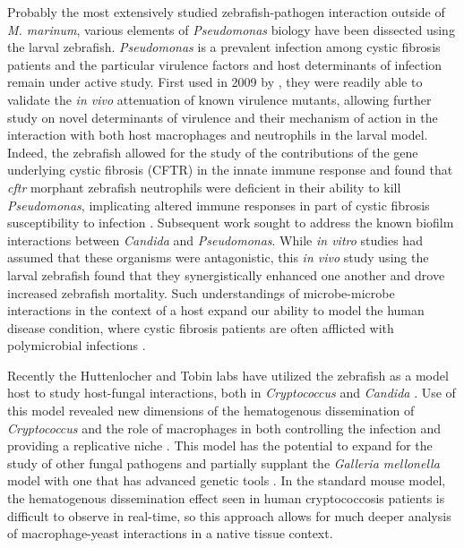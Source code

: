 Probably the most extensively studied zebrafish-pathogen interaction outside of \textit{M. marinum}, various elements of \textit{Pseudomonas} biology have been dissected using the larval zebrafish. \textit{Pseudomonas} is a prevalent infection among cystic fibrosis patients and  the particular virulence factors and host determinants of infection remain under active study. First used in 2009 by \citeauthor{Clatworthy2009}, they were readily able to validate the \textit{in vivo} attenuation of known virulence mutants, allowing further study on novel determinants of virulence and their mechanism of action in the interaction with both host macrophages and neutrophils in the larval model. Indeed, the zebrafish allowed for the study of the contributions of the gene underlying cystic fibrosis (CFTR) in the innate immune response and found that \textit{cftr} morphant zebrafish neutrophils were deficient in their ability to kill \textit{Pseudomonas}, implicating altered immune responses in part of cystic fibrosis susceptibility to infection \citep{Phennicie2010}. Subsequent work sought to address the known biofilm interactions between \textit{Candida} and \textit{Pseudomonas}. While \textit{in vitro} studies had assumed that these organisms were antagonistic, this \textit{in vivo} study using the larval zebrafish found that they synergistically enhanced one another and drove increased zebrafish mortality. Such understandings of microbe-microbe interactions in the context of a host expand our ability to model the human disease condition, where cystic fibrosis patients are often afflicted with polymicrobial infections \citep{Bergeron2017}. 

Recently the Huttenlocher and Tobin labs have utilized the zebrafish as a model host to study host-fungal interactions, both in \textit{Cryptococcus} and \textit{Candida} \citep{Johnson2018}. Use of this model revealed new dimensions of the hematogenous dissemination of \textit{Cryptococcus} and the role of macrophages in both controlling the infection and providing a replicative niche \citep{Tenor2015, Davis2016}. This model has the potential to expand for the study of other fungal pathogens and partially supplant the \textit{Galleria mellonella} model with one that has advanced genetic tools \citep{Rosowski2018}. In the standard mouse model, the hematogenous dissemination effect seen in human cryptococcosis patients is difficult to observe in real-time, so this approach allows for much deeper analysis of macrophage-yeast interactions in a native tissue context. 

